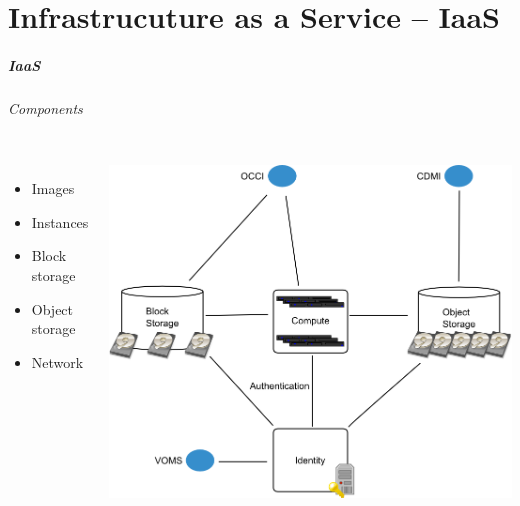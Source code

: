 \label{part_iaas}
\part{Infrastrucuture as a Service -- IaaS}

\begin{frame}
\frametitle{IaaS}
\framesubtitle{Components}
\begin{columns}
\begin{itemize}
\item Images
\item Instances
\item Block storage
\item Object storage
\item Network
\end{itemize}
\includegraphics[width=\textwidth]{images/IaaS_OCCI.png}
\end{columns}
\end{frame}

